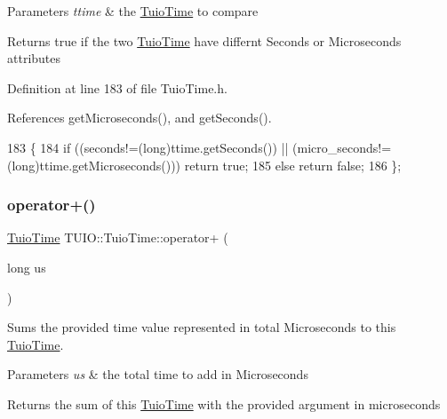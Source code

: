 \begin{DoxyParams}{Parameters}
{\em ttime} & the \hyperlink{class_t_u_i_o_1_1_tuio_time}{Tuio\+Time} to compare \\
\hline
\end{DoxyParams}
\begin{DoxyReturn}{Returns}
true if the two \hyperlink{class_t_u_i_o_1_1_tuio_time}{Tuio\+Time} have differnt Seconds or Microseconds attributes 
\end{DoxyReturn}


Definition at line 183 of file Tuio\+Time.\+h.



References get\+Microseconds(), and get\+Seconds().


\begin{DoxyCode}
183                                         \{
184             \textcolor{keywordflow}{if} ((seconds!=(\textcolor{keywordtype}{long})ttime.getSeconds()) || (micro\_seconds!=(\textcolor{keywordtype}{long})ttime.getMicroseconds())) \textcolor{keywordflow}{
      return} \textcolor{keyword}{true};
185             \textcolor{keywordflow}{else} \textcolor{keywordflow}{return} \textcolor{keyword}{false};
186         \};
\end{DoxyCode}
\mbox{\label{class_t_u_i_o_1_1_tuio_time_a182951527d8e7654a653ac49112a9fb1}} 
\subsubsection{\texorpdfstring{operator+()}{operator+()}\hspace{0.1cm}{\footnotesize\ttfamily [1/2]}}
{\footnotesize\ttfamily \hyperlink{class_t_u_i_o_1_1_tuio_time}{Tuio\+Time} T\+U\+I\+O\+::\+Tuio\+Time\+::operator+ (\begin{DoxyParamCaption}\item[{long}]{us }\end{DoxyParamCaption})\hspace{0.3cm}{\ttfamily [inline]}}

Sums the provided time value represented in total Microseconds to this \hyperlink{class_t_u_i_o_1_1_tuio_time}{Tuio\+Time}.


\begin{DoxyParams}{Parameters}
{\em us} & the total time to add in Microseconds \\
\hline
\end{DoxyParams}
\begin{DoxyReturn}{Returns}
the sum of this \hyperlink{class_t_u_i_o_1_1_tuio_time}{Tuio\+Time} with the provided argument in microseconds 
\end{DoxyReturn}


